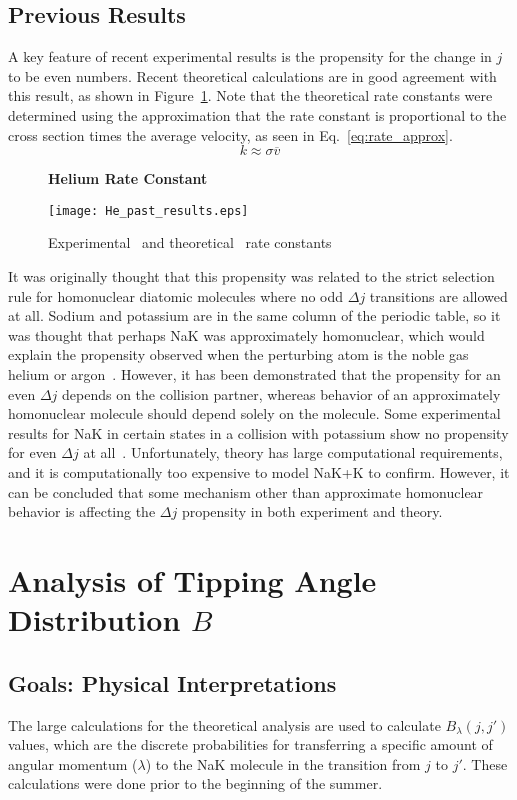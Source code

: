 \documentclass[letterpaper,11pt]{article}
\begin{document}
\subsection{Previous Results}
A key feature of recent experimental results is the propensity for the change
in $j$ to be even numbers.  Recent theoretical calculations are in good
agreement with this result, as shown in Figure~\ref{fig:He_past_results}.  Note
that the theoretical rate constants were determined using the approximation that
the rate constant is proportional to the cross section times the average
velocity, as seen in Eq.~\ref{eq:rate_approx}.
\begin{equation}
    k\approx\sigma\overline v
\label{eq:rate_approx}
\end{equation}
\begin{figure}[ht]
    \centering
    \textbf{Helium Rate Constant}\par\medskip
    \texttt{[image: He\_past\_results.eps]}
    \caption{Experimental~\cite{Jon15} and theoretical~\cite{Mal15} rate constants}
\label{fig:He_past_results}
\end{figure}

It was originally thought that this propensity was related to the strict
selection rule for homonuclear diatomic molecules where no odd $\Delta j$
transitions are allowed at all.  Sodium and potassium are in the same column of
the periodic table, so it was thought that perhaps NaK was approximately
homonuclear, which would explain the propensity observed when the perturbing
atom is the noble gas helium or argon~\cite{Jon15}.  However, it has been
demonstrated that the propensity for an even $\Delta j$ depends on the
collision partner, whereas behavior of an approximately homonuclear molecule
should depend solely on the molecule.  Some experimental results for NaK in
certain states in a collision with potassium show no propensity for even
$\Delta j$ at all~\cite{Wol11}.  Unfortunately, theory has large computational
requirements, and it is computationally too expensive to model NaK+K to
confirm.  However, it can be concluded that some mechanism other than
approximate homonuclear behavior is affecting the $\Delta j$ propensity in both
experiment and theory.

\section{Analysis of Tipping Angle Distribution $B$}
\subsection{Goals: Physical Interpretations}
The large calculations for the theoretical analysis are used to calculate
$B_\lambda(j,j')$ values, which are the discrete probabilities for transferring
a specific amount of angular momentum ($\lambda$) to the NaK molecule in the
transition from $j$ to $j'$.  These calculations were done prior to the
beginning of the summer.
\end{document}

